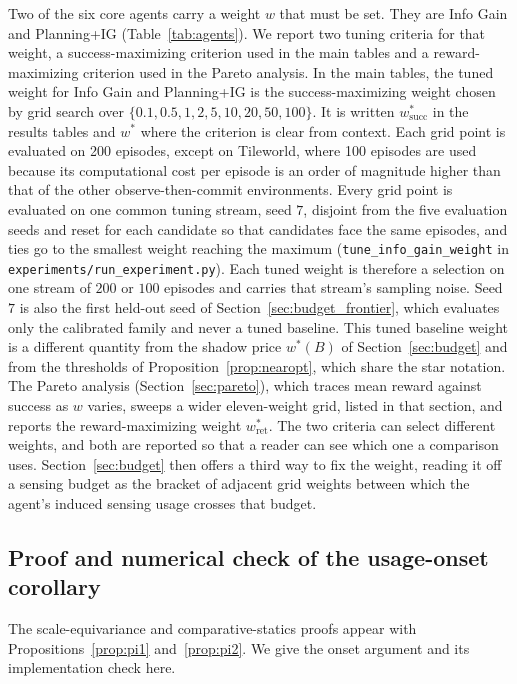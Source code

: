 Two of the six core agents carry a weight $w$ that must be set. They are Info Gain and Planning+IG (Table~\ref{tab:agents}). We report two tuning criteria for that weight, a success-maximizing criterion used in the main tables and a reward-maximizing criterion used in the Pareto analysis. In the main tables, the tuned weight for Info Gain and Planning+IG is the success-maximizing weight chosen by grid search over $\{0.1, 0.5, 1, 2, 5, 10, 20, 50, 100\}$. It is written $w^*_{\mathrm{succ}}$ in the results tables and $w^*$ where the criterion is clear from context. Each grid point is evaluated on 200 episodes, except on Tileworld, where 100 episodes are used because its computational cost per episode is an order of magnitude higher than that of the other observe-then-commit environments. Every grid point is evaluated on one common tuning stream, seed $7$, disjoint from the five evaluation seeds and reset for each candidate so that candidates face the same episodes, and ties go to the smallest weight reaching the maximum (\texttt{tune\_\allowbreak info\_\allowbreak gain\_\allowbreak weight} in \texttt{experiments/\allowbreak run\_\allowbreak experiment.py}). Each tuned weight is therefore a selection on one stream of $200$ or $100$ episodes and carries that stream's sampling noise. Seed $7$ is also the first held-out seed of Section~\ref{sec:budget_frontier}, which evaluates only the calibrated family and never a tuned baseline. This tuned baseline weight is a different quantity from the shadow price $w^*(B)$ of Section~\ref{sec:budget} and from the thresholds of Proposition~\ref{prop:nearopt}, which share the star notation. The Pareto analysis (Section~\ref{sec:pareto}), which traces mean reward against success as $w$ varies, sweeps a wider eleven-weight grid, listed in that section, and reports the reward-maximizing weight $w^*_{\mathrm{ret}}$. The two criteria can select different weights, and both are reported so that a reader can see which one a comparison uses. Section~\ref{sec:budget} then offers a third way to fix the weight, reading it off a sensing budget as the bracket of adjacent grid weights between which the agent's induced sensing usage crosses that budget.

\subsection{Proof and numerical check of the usage-onset corollary}
\label{app:theory_budget_proofs}

The scale-equivariance and comparative-statics proofs appear with Propositions~\ref{prop:pi1} and~\ref{prop:pi2}. We give the onset argument and its implementation check here.

